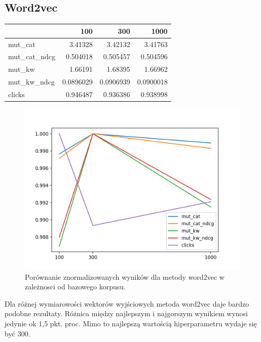 \documentclass[pl]{minipw} %
\begin{document}
\subsection{Word2vec}

\begin{center}
	\begin{tabular}{lrrr}
		\hline
		&       100 &       300 &      1000 \\
		\hline
		mut\_cat      & 3.41328   & 3.42132   & 3.41763   \\
		mut\_cat\_ndcg & 0.504018  & 0.505457  & 0.504596  \\
		mut\_kw       & 1.66191   & 1.68395   & 1.66962   \\
		mut\_kw\_ndcg  & 0.0896029 & 0.0906939 & 0.0900018 \\
		clicks       & 0.946487  & 0.936386  & 0.938998  \\
		\hline
	\end{tabular}
\end{center}

\begin{figure}[H]
	\centering
	\includegraphics[width=1\textwidth]{img/results/w2v_ctr.png}
	\caption{Porównanie znormalizowanych wyników dla metody word2vec w zależnosci od bazowego korpusu.}
\end{figure}

Dla różnej wymiarowości wektorów wyjściowych metoda word2vec daje bardzo podobne rezultaty. Różnica między najlepszym i najgorszym wynikiem wynosi jedynie ok 1,5 pkt. proc. Mimo to najlepszą wartością hiperparametru wydaje się być 300.
\end{document}
